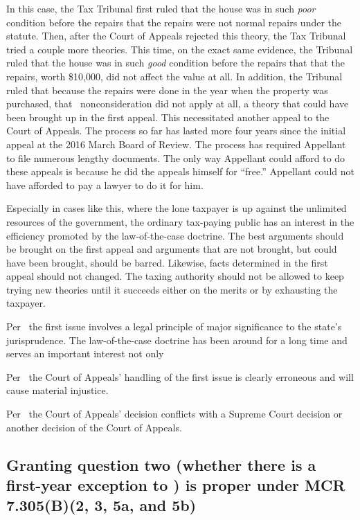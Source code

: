 \documentclass[12pt,\documentclassflag]{michiganCourtOfAppealsBrief}
\begin{document}
In this case, the Tax Tribunal first ruled that the house was in such \emph{poor} condition before the repairs that the repairs were not normal repairs under the statute. Then, after the Court of Appeals rejected this theory, the Tax Tribunal tried a couple more theories. This time, on the exact same evidence, the Tribunal ruled that the house was in such \emph{good} condition before the repairs that that the repairs, worth \$10,000, did not affect the value at all. In addition, the Tribunal ruled that because the repairs were done in the year when the property was purchased, that \mathieuGast\ nonconsideration did not apply at all, a theory that could have been brought up in the first appeal. This necessitated another appeal to the Court of Appeals. The process so far has lasted more four years since the initial appeal at the 2016 March Board of Review. The process has required Appellant to file numerous lengthy documents. The only way Appellant could afford to do these appeals is because he did the appeals himself for ``free.'' Appellant could not have afforded to pay a lawyer to do it for him.

Especially in cases like this, where the lone taxpayer is up against the unlimited resources of the government, the ordinary tax-paying public has an interest in the efficiency promoted by the law-of-the-case doctrine. The best arguments should be brought on the first appeal and arguments that are not brought, but could have been brought, should be barred. Likewise, facts determined in the first appeal should not changed. The taxing authority should not be allowed to keep trying new theories until it succeeds either on the merits or by exhausting the taxpayer. 

Per \cite{MCR 7.305(B)(3)}\ the first issue involves a legal principle of major significance to the state's jurisprudence. The law-of-the-case doctrine has been around for a long time and serves an important interest not only 

Per \cite{MCR 7.305(B)(5a)}\ the Court of Appeals' handling of the first issue is clearly erroneous and will cause material injustice.

Per \cite{MCR 7.305(B)(5b)}\ the Court of Appeals' decision conflicts with a Supreme Court decision or another decision of the Court of Appeals. 

\subsection{Granting question two (whether there is a first-year exception to \mathieuGast) is proper under MCR 7.305(B)(2, 3, 5a, and 5b)}
\end{document}
